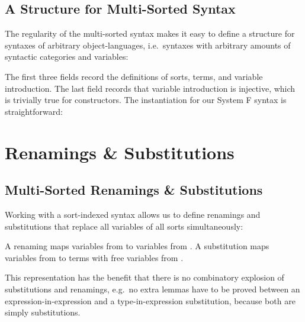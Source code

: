 \documentclass[a4paper, UKenglish, cleveref, autoref, thm-restate]{lipics-v2021}
\newenvironment{LibCode*}{%
  \begin{tcolorbox}[%
    colframe=white,%
    boxrule=0.0pt,%
    top=2.5pt,%
    left=2.5pt,%
    bottom=2.5pt,%
    right=2.5pt,%
    boxsep=0pt%
  ]\vspace{-0.2\baselineskip}%
}{%
  \vspace{-1\baselineskip}%
  \end{tcolorbox}%
}
\newenvironment{ExampleCode*}{%
  \begin{tcolorbox}[%
    colframe=white,%
    colback=yellow!5,%
    boxrule=0.0pt,%
    top=2.5pt,%
    left=2.5pt,%
    bottom=2.5pt,%
    right=2.5pt,%
    boxsep=0pt%
  ]\vspace{-0.2\baselineskip}%
}{%
  \vspace{-1\baselineskip}%
  \end{tcolorbox}%
}
\newcommand*\LibCode[1]{\begin{LibCode*}{#1}\end{LibCode*}}
\newcommand*\AppCode[1]{{#1}}
\newcommand*\ExampleCode[1]{\begin{ExampleCode*}{#1}\end{ExampleCode*}}
\newcommand*\ACode[1]{\AgdaFontStyle{\textcolor{mygray}{#1}}}
\newcommand*\AField[1]{\AgdaField{#1}}
\newcommand*\ACon[1]{\AgdaInductiveConstructor{#1}}
\newcommand*\ADef[1]{\AgdaFunction{#1}}
\begin{document}

  \subsection{A Structure for Multi-Sorted Syntax}
  \label{sec:syntax:structure}
  The regularity of the multi-sorted syntax makes it easy to define a
  structure for syntaxes of arbitrary object-languages, i.e.\ syntaxes
  with arbitrary amounts of syntactic categories and variables:
  \LibCode\KSyntax
  The first three fields record the definitions of sorts, terms, and variable introduction.
  The last field records that variable introduction
  \ACode{\AField{`\_}} is injective, which is trivially true for
  constructors. The instantiation for our System F syntax is
  straightforward:
  \AppCode\FSyntaxInst

  \section{Renamings \& Substitutions}
  \label{sec:maps}
  \subsection{Multi-Sorted Renamings \& Substitutions}
  \label{sec:maps:example}
  Working with a sort-indexed syntax allows us to define renamings and substitutions
  that replace all variables of all sorts simultaneously:

  \ExampleCode\FExampleSubRen

  A renaming \ACode{S₁ \ADef{→ᵣ} S₂} maps variables from \ACode{S₁} to
  variables from \ACode{S₂}.
  A substitution \ACode{S₁ \ADef{→ₛ} S₂} maps variables from \ACode{S₁} to
  terms with free variables from \ACode{S₂}.


  This representation has the benefit that there is no combinatory
  explosion of substitutions and renamings, e.g.\ no extra lemmas have to be
  proved between an expression-in-expression and a type-in-expression
  substitution, because both are simply substitutions.
\end{document}
